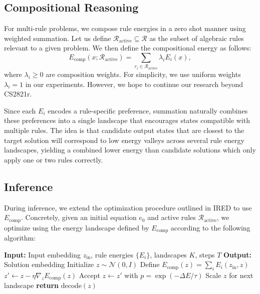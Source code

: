 \documentclass{article}
\begin{document}
\subsection{Compositional Reasoning}

For multi-rule problems, we compose rule energies in a zero shot manner using weighted summation. Let us define $\mathcal{R}_{\text{active}} \subseteq \mathcal{R}$ as the subset of algebraic rules relevant to a given problem. We then define the compositional energy as follows:
\begin{equation}
E_{\text{comp}}(x; \mathcal{R}_{\text{active}}) = \sum_{r_i \in \mathcal{R}_{\text{active}}} \lambda_i E_i(x),
\end{equation}
where $\lambda_i \geq 0$ are composition weights. For simplicity, we use uniform weights $\lambda_i = 1$ in our experiments. However, we hope to continue our research beyond CS2821r.

Since each $E_i$ encodes a rule-specific preference, summation naturally combines these preferences into a single landscape that encourages states compatible with multiple rules. The idea is that candidate output states that are closest to the target solution will correspond to low energy valleys across several rule energy landscapes, yielding a combined lower energy than candidate solutions which only apply one or two rules correctly.

\subsection{Inference}

During inference, we extend the optimization procedure outlined in IRED to use $E_{\text{comp}}$. Concretely, given an initial equation $e_0$ and active rules $\mathcal{R}_{\text{active}}$, we optimize using the energy landscape defined by $E_{\text{comp}}$ according to the following algorithm:

\begin{algorithm}
\caption{Compositional IRED Inference}
\begin{algorithmic}[1]
\STATE \textbf{Input:} Input embedding $z_{\text{in}}$, rule energies $\{E_i\}$, landscapes $K$, steps $T$
\STATE \textbf{Output:} Solution embedding
\STATE Initialize $z \sim \mathcal{N}(0, I)$
\STATE Define $E_{\text{comp}}(z) = \sum_{i} E_i(z_{\text{in}}, z)$
        \STATE $z' \leftarrow z - \eta \nabla_z E_{\text{comp}}(z)$
        \STATE Accept $z \leftarrow z'$ with $p = \exp(-\Delta E / \tau)$
    \ENDFOR
    \STATE Scale $z$ for next landscape
\ENDFOR
\STATE \textbf{return} $\text{decode}(z)$
\end{algorithmic}
\end{algorithm}
\end{document}
